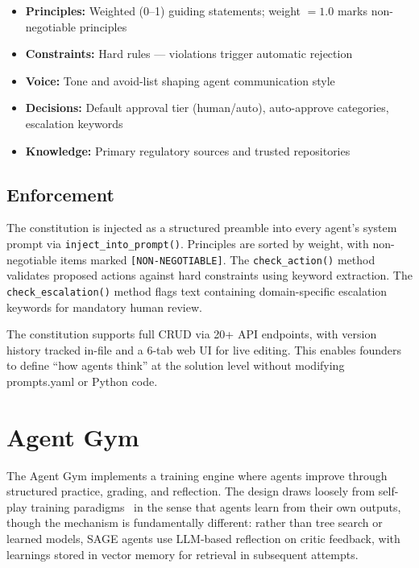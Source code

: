 \documentclass[11pt,a4paper]{article}
\begin{document}
\begin{itemize}[noitemsep]
    \item \textbf{Principles:} Weighted (0--1) guiding statements; weight $= 1.0$ marks non-negotiable principles
    \item \textbf{Constraints:} Hard rules --- violations trigger automatic rejection
    \item \textbf{Voice:} Tone and avoid-list shaping agent communication style
    \item \textbf{Decisions:} Default approval tier (human/auto), auto-approve categories, escalation keywords
    \item \textbf{Knowledge:} Primary regulatory sources and trusted repositories
\end{itemize}

\subsection{Enforcement}

The constitution is injected as a structured preamble into every agent's system prompt via \texttt{inject\_into\_prompt()}. Principles are sorted by weight, with non-negotiable items marked \texttt{[NON-NEGOTIABLE]}. The \texttt{check\_action()} method validates proposed actions against hard constraints using keyword extraction. The \texttt{check\_escalation()} method flags text containing domain-specific escalation keywords for mandatory human review.

The constitution supports full CRUD via 20+ API endpoints, with version history tracked in-file and a 6-tab web UI for live editing. This enables founders to define ``how agents think'' at the solution level without modifying prompts.yaml or Python code.

\section{Agent Gym}
\label{sec:gym}

The Agent Gym implements a training engine where agents improve through structured practice, grading, and reflection. The design draws loosely from self-play training paradigms~\citep{silver2018alphazero, schrittwieser2020muzero} in the sense that agents learn from their own outputs, though the mechanism is fundamentally different: rather than tree search or learned models, SAGE agents use LLM-based reflection on critic feedback, with learnings stored in vector memory for retrieval in subsequent attempts.
\end{document}
